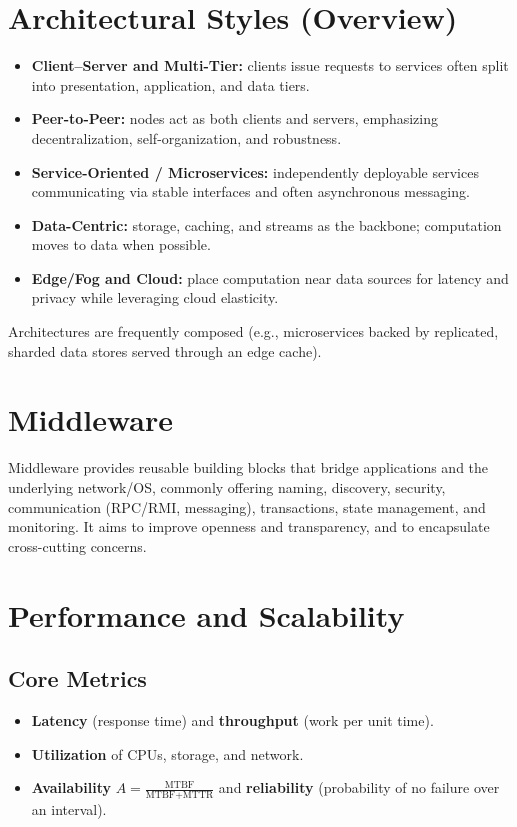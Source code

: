 \section{Architectural Styles (Overview)}
\begin{itemize}
  \item \textbf{Client--Server and Multi-Tier:} clients issue requests to services often split into presentation, application, and data tiers.
  \item \textbf{Peer-to-Peer:} nodes act as both clients and servers, emphasizing decentralization, self-organization, and robustness.
  \item \textbf{Service-Oriented / Microservices:} independently deployable services communicating via stable interfaces and often asynchronous messaging.
  \item \textbf{Data-Centric:} storage, caching, and streams as the backbone; computation moves to data when possible.
  \item \textbf{Edge/Fog and Cloud:} place computation near data sources for latency and privacy while leveraging cloud elasticity.
\end{itemize}
Architectures are frequently composed (e.g., microservices backed by replicated, sharded data stores served through an edge cache).

\section{Middleware}
Middleware provides reusable building blocks that bridge applications and the underlying network/OS, commonly offering naming, discovery, security, communication (RPC/RMI, messaging), transactions, state management, and monitoring. It aims to improve openness and transparency, and to encapsulate cross-cutting concerns.

\section{Performance and Scalability}
\subsection{Core Metrics}
\begin{itemize}
  \item \textbf{Latency} (response time) and \textbf{throughput} (work per unit time).
  \item \textbf{Utilization} of CPUs, storage, and network.
  \item \textbf{Availability} \(A = \tfrac{\text{MTBF}}{\text{MTBF}+\text{MTTR}}\) and \textbf{reliability} (probability of no failure over an interval).
\end{itemize}

